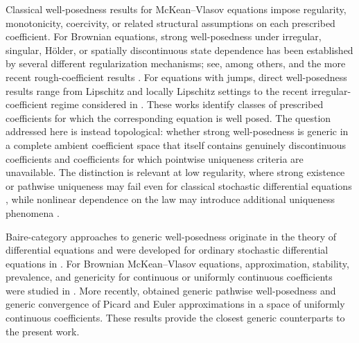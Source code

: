 \documentclass[12pt,oneside, reqno]{amsart}
\numberwithin{equation}{section}
\begin{document}
	Classical well-posedness results for McKean--Vlasov equations impose
	regularity, monotonicity, coercivity, or related structural assumptions on
	each prescribed coefficient. For Brownian equations, strong well-posedness
	under irregular, singular, H\"older, or spatially discontinuous state
	dependence has been established by several different regularization
	mechanisms; see, among others,
	\cite{Bauer-MeyerBrandis-Proske-2018,Chaudru-de-Raynal-2020,
		Huang-Wang-2019,Rockner-Zhang-2021,Leobacher-Reisinger-Stockinger-2022}
	and the more recent rough-coefficient results
	\cite{Pascucci-Rondelli-2025,Pascucci-Rondelli-Veretennikov-2026}.
	For equations with jumps, direct well-posedness results range from
	Lipschitz and locally Lipschitz settings
	\cite{Graham-1992,Jourdain-Meleard-Woyczynski-2008,Hao-Li-2016,
		Erny-2022,Cavallazzi-2025,Chao-Duan-Wei-2023} to the recent
	irregular-coefficient regime considered in \cite{Wang-Ren-Miao-2024}.
	These works identify classes of prescribed coefficients for which the
	corresponding equation is well posed. The question addressed here is
	instead topological: whether strong well-posedness is generic in a complete
	ambient coefficient space that itself contains genuinely discontinuous
	coefficients and coefficients for which pointwise uniqueness criteria are
	unavailable. The distinction is relevant at low regularity, where strong
	existence or pathwise uniqueness may fail even for classical stochastic
	differential equations \cite{BARLOW-1982}, while nonlinear dependence on
	the law may introduce additional uniqueness phenomena
	\cite{Scheutzow-1987}.
	
	Baire-category approaches to generic well-posedness originate in the
	theory of differential equations \cite{Orlicz-1932,Lasota-1973-Yorke}
	and were developed for ordinary stochastic differential equations in
	\cite{Heunis-1986,Bahlali-Mezerdi-1996-Ouknine,
		Bahlali-Mezerdi-1998-Ouknine}. For Brownian McKean--Vlasov equations,
	approximation, stability, prevalence, and genericity for continuous or
	uniformly continuous coefficients were studied in
	\cite{Mezerdi-2019,Bahlali-Mezerdi-Mezerdi-2020,
		Mezerdi-Khelfallah-2021}. More recently, \cite{Mezerdi2025} obtained
	generic pathwise well-posedness and generic convergence of Picard and Euler
	approximations in a space of uniformly continuous coefficients. These
	results provide the closest generic counterparts to the present work.
	
\end{document}
